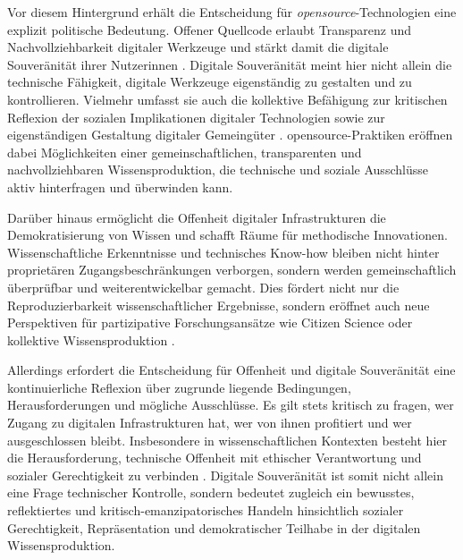 Vor diesem Hintergrund erhält die Entscheidung für \textit{\gls{opensource}}-Technologien eine explizit politische Bedeutung. Offener Quellcode erlaubt Transparenz und Nachvollziehbarkeit digitaler Werkzeuge und stärkt damit die digitale Souveränität ihrer Nutzer\genderstern innen \parencite{gurumurthyDataBodiesNew2022}. Digitale Souveränität meint hier nicht allein die technische Fähigkeit, digitale Werkzeuge eigenständig zu gestalten und zu kontrollieren. Vielmehr umfasst sie auch die kollektive Befähigung zur kritischen Reflexion der sozialen Implikationen digitaler Technologien sowie zur eigenständigen Gestaltung digitaler Gemeingüter \parencite{baackDataficationEmpowermentHow2015}. \gls{opensource}-Praktiken eröffnen dabei Möglichkeiten einer gemeinschaftlichen, transparenten und nachvollziehbaren Wissensproduktion, die technische und soziale Ausschlüsse aktiv hinterfragen und überwinden kann.

Darüber hinaus ermöglicht die Offenheit digitaler Infrastrukturen die Demokratisierung von Wissen und schafft Räume für methodische Innovationen. Wissenschaftliche Erkenntnisse und technisches Know-how bleiben nicht hinter proprietären Zugangsbeschränkungen verborgen, sondern werden gemeinschaftlich überprüfbar und weiterentwickelbar gemacht. Dies fördert nicht nur die Reproduzierbarkeit wissenschaftlicher Ergebnisse, sondern eröffnet auch neue Perspektiven für partizipative Forschungsansätze wie Citizen Science oder kollektive Wissensproduktion \parencite{fecherWhatDrivesAcademic2014}.

Allerdings erfordert die Entscheidung für Offenheit und digitale Souveränität eine kontinuierliche Reflexion über zugrunde liegende Bedingungen, Herausforderungen und mögliche Ausschlüsse. Es gilt stets kritisch zu fragen, wer Zugang zu digitalen Infrastrukturen hat, wer von ihnen profitiert und wer ausgeschlossen bleibt. Insbesondere in wissenschaftlichen Kontexten besteht hier die Herausforderung, technische Offenheit mit ethischer Verantwortung und sozialer Gerechtigkeit zu verbinden \parencite{gurumurthyDataBodiesNew2022}. Digitale Souveränität ist somit nicht allein eine Frage technischer Kontrolle, sondern bedeutet zugleich ein bewusstes, reflektiertes und kritisch-emanzipatorisches Handeln hinsichtlich sozialer Gerechtigkeit, Repräsentation und demokratischer Teilhabe in der digitalen Wissensproduktion.

